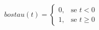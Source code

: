 \documentclass[preview]{standalone}
\begin{document}
\begin{align*}
bosta u(t) = \begin{cases} 0, & \text{se } t < 0 \\ 1, & \text{se } t \geq 0 \end{cases}
\end{align*}
\end{document}
